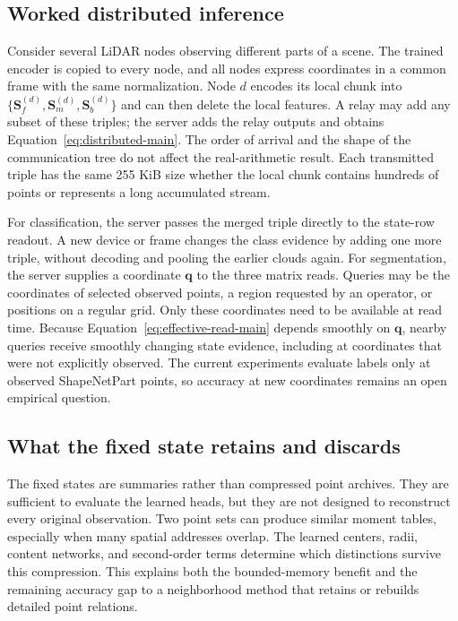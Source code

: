 \documentclass[11pt,a4paper]{article}
\newcommand{\Sstate}{\mathbf{S}}
\begin{document}
\subsection{Worked distributed inference}
Consider several LiDAR nodes observing different parts of a scene. The trained encoder is copied to every node, and all nodes express coordinates in a common frame with the same normalization. Node $d$ encodes its local chunk into $\{\Sstate_f^{(d)},\Sstate_m^{(d)},\Sstate_b^{(d)}\}$ and can then delete the local features. A relay may add any subset of these triples; the server adds the relay outputs and obtains Equation~\eqref{eq:distributed-main}. The order of arrival and the shape of the communication tree do not affect the real-arithmetic result. Each transmitted triple has the same 255 KiB size whether the local chunk contains hundreds of points or represents a long accumulated stream.

For classification, the server passes the merged triple directly to the state-row readout. A new device or frame changes the class evidence by adding one more triple, without decoding and pooling the earlier clouds again. For segmentation, the server supplies a coordinate $\bm q$ to the three matrix reads. Queries may be the coordinates of selected observed points, a region requested by an operator, or positions on a regular grid. Only these coordinates need to be available at read time. Because Equation~\eqref{eq:effective-read-main} depends smoothly on $\bm q$, nearby queries receive smoothly changing state evidence, including at coordinates that were not explicitly observed. The current experiments evaluate labels only at observed ShapeNetPart points, so accuracy at new coordinates remains an open empirical question.

\subsection{What the fixed state retains and discards}
\label{sec:bottleneck}
The fixed states are summaries rather than compressed point archives. They are sufficient to evaluate the learned heads, but they are not designed to reconstruct every original observation. Two point sets can produce similar moment tables, especially when many spatial addresses overlap. The learned centers, radii, content networks, and second-order terms determine which distinctions survive this compression. This explains both the bounded-memory benefit and the remaining accuracy gap to a neighborhood method that retains or rebuilds detailed point relations.
\end{document}
